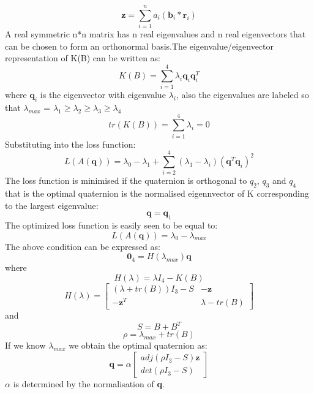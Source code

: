 \documentclass[../../main.tex]{subfiles}
\begin{document}
{{{\begin{equation}
    \textbf{z}= \sum_{i=1}^{n} a_{i} (\textbf{b}_{i} * \textbf{r}_{i})
\end{equation}
A real symmetric n*n matrix has n real eigenvalues and n real eigenvectors that can be chosen to form an  orthonormal basis.The eigenvalue/eigenvector representation of K(B) can be written as:
\begin{equation}
\label{value_of_K_matrix}
    K(B)= \sum_{i=1}^{4} \lambda_{i} \textbf{q}_{i} \textbf{q}_{i}^{T}
\end{equation}
where $\textbf {q}_i $ is the eigenvector with eigenvalue $\lambda_i$, also the eigenvalues are labeled so that 
$\lambda_{max}$ = $\lambda_1 \geq \lambda_2 \geq \lambda_3 \geq \lambda_4$
\begin{equation}
 tr(K(B))= \sum_{i=1}^{4} \lambda_{i} =0   
\end{equation}
Substituting into the loss function:
\begin{equation}
    L(A(\textbf{q}))= \lambda_{0} - \lambda_{1} + \sum_{i=2}^{4} (\lambda_{1} - \lambda_{i}) (\textbf{q}^T \textbf{q}_{i})^{2}
\end{equation}
The loss function is minimised if the quaternion is orthogonal to $q_2$, $q_3$ and $q_4$ that is the optimal quaternion is the normalised eigennvector of K corresponding to the largest eigenvalue:
\begin{equation}
    \textbf{q}= \textbf{q}_{1}
\end{equation}
The optimized loss function is easily seen to be equal to:
\begin{equation}
    L(A(\textbf{q}))= \lambda_{0}- \lambda_{max}
\end{equation}
The above condition can be expressed as:
\begin{equation}
\textbf{0}_4 = H(\lambda_{max}) \textbf{q}
\end{equation}
where 
\begin{equation}
H(\lambda)= \lambda I_{4} - K(B)
\end{equation}
\begin{equation}
\label{value_of_H_matrix}
 H(\lambda)=
  \begin{bmatrix}
 (\lambda+ tr(B)) I_{3} - S  & -\textbf{z}    \\
  -\textbf{z}^T  &  \lambda- tr(B)
  \end{bmatrix}
\end{equation}
and 
\begin{equation}
    S= B + B^{T}
\end{equation}
\begin{equation}
    \rho= \lambda_{max} + tr(B)
\end{equation}
If we know $\lambda _{max}$ we obtain the optimal quaternion as:
\begin{equation}
\label{final_quaternion}
    \textbf{q}=\alpha
    \begin{bmatrix}
    adj(\rho I_{3} - S)\textbf{z} \\
    det(\rho I_{3} - S)
    \end{bmatrix}
\end{equation}
\(\alpha\) is determined by the normalisation of \textbf{q}.

}}}
\end{document}
